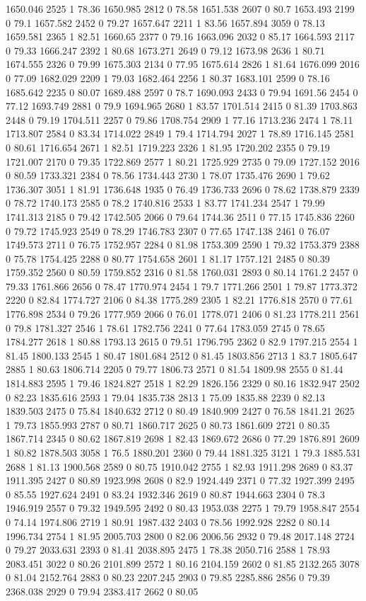 1650.046	2525	1	78.36
1650.985	2812	0	78.58
1651.538	2607	0	80.7
1653.493	2199	0	79.1
1657.582	2452	0	79.27
1657.647	2211	1	83.56
1657.894	3059	0	78.13
1659.581	2365	1	82.51
1660.65	2377	0	79.16
1663.096	2032	0	85.17
1664.593	2117	0	79.33
1666.247	2392	1	80.68
1673.271	2649	0	79.12
1673.98	2636	1	80.71
1674.555	2326	0	79.99
1675.303	2134	0	77.95
1675.614	2826	1	81.64
1676.099	2016	0	77.09
1682.029	2209	1	79.03
1682.464	2256	1	80.37
1683.101	2599	0	78.16
1685.642	2235	0	80.07
1689.488	2597	0	78.7
1690.093	2433	0	79.94
1691.56	2454	0	77.12
1693.749	2881	0	79.9
1694.965	2680	1	83.57
1701.514	2415	0	81.39
1703.863	2448	0	79.19
1704.511	2257	0	79.86
1708.754	2909	1	77.16
1713.236	2474	1	78.11
1713.807	2584	0	83.34
1714.022	2849	1	79.4
1714.794	2027	1	78.89
1716.145	2581	0	80.61
1716.654	2671	1	82.51
1719.223	2326	1	81.95
1720.202	2355	0	79.19
1721.007	2170	0	79.35
1722.869	2577	1	80.21
1725.929	2735	0	79.09
1727.152	2016	0	80.59
1733.321	2384	0	78.56
1734.443	2730	1	78.07
1735.476	2690	1	79.62
1736.307	3051	1	81.91
1736.648	1935	0	76.49
1736.733	2696	0	78.62
1738.879	2339	0	78.72
1740.173	2585	0	78.2
1740.816	2533	1	83.77
1741.234	2547	1	79.99
1741.313	2185	0	79.42
1742.505	2066	0	79.64
1744.36	2511	0	77.15
1745.836	2260	0	79.72
1745.923	2549	0	78.29
1746.783	2307	0	77.65
1747.138	2461	0	76.07
1749.573	2711	0	76.75
1752.957	2284	0	81.98
1753.309	2590	1	79.32
1753.379	2388	0	75.78
1754.425	2288	0	80.77
1754.658	2601	1	81.17
1757.121	2485	0	80.39
1759.352	2560	0	80.59
1759.852	2316	0	81.58
1760.031	2893	0	80.14
1761.2	2457	0	79.33
1761.866	2656	0	78.47
1770.974	2454	1	79.7
1771.266	2501	1	79.87
1773.372	2220	0	82.84
1774.727	2106	0	84.38
1775.289	2305	1	82.21
1776.818	2570	0	77.61
1776.898	2534	0	79.26
1777.959	2066	0	76.01
1778.071	2406	0	81.23
1778.211	2561	0	79.8
1781.327	2546	1	78.61
1782.756	2241	0	77.64
1783.059	2745	0	78.65
1784.277	2618	1	80.88
1793.13	2615	0	79.51
1796.795	2362	0	82.9
1797.215	2554	1	81.45
1800.133	2545	1	80.47
1801.684	2512	0	81.45
1803.856	2713	1	83.7
1805.647	2885	1	80.63
1806.714	2205	0	79.77
1806.73	2571	0	81.54
1809.98	2555	0	81.44
1814.883	2595	1	79.46
1824.827	2518	1	82.29
1826.156	2329	0	80.16
1832.947	2502	0	82.23
1835.616	2593	1	79.04
1835.738	2813	1	75.09
1835.88	2239	0	82.13
1839.503	2475	0	75.84
1840.632	2712	0	80.49
1840.909	2427	0	76.58
1841.21	2625	1	79.73
1855.993	2787	0	80.71
1860.717	2625	0	80.73
1861.609	2721	0	80.35
1867.714	2345	0	80.62
1867.819	2698	1	82.43
1869.672	2686	0	77.29
1876.891	2609	1	80.82
1878.503	3058	1	76.5
1880.201	2360	0	79.44
1881.325	3121	1	79.3
1885.531	2688	1	81.13
1900.568	2589	0	80.75
1910.042	2755	1	82.93
1911.298	2689	0	83.37
1911.395	2427	0	80.89
1923.998	2608	0	82.9
1924.449	2371	0	77.32
1927.399	2495	0	85.55
1927.624	2491	0	83.24
1932.346	2619	0	80.87
1944.663	2304	0	78.3
1946.919	2557	0	79.32
1949.595	2492	0	80.43
1953.038	2275	1	79.79
1958.847	2554	0	74.14
1974.806	2719	1	80.91
1987.432	2403	0	78.56
1992.928	2282	0	80.14
1996.734	2754	1	81.95
2005.703	2800	0	82.06
2006.56	2932	0	79.48
2017.148	2724	0	79.27
2033.631	2393	0	81.41
2038.895	2475	1	78.38
2050.716	2588	1	78.93
2083.451	3022	0	80.26
2101.899	2572	1	80.16
2104.159	2602	0	81.85
2132.265	3078	0	81.04
2152.764	2883	0	80.23
2207.245	2903	0	79.85
2285.886	2856	0	79.39
2368.038	2929	0	79.94
2383.417	2662	0	80.05

